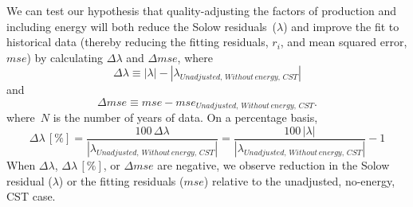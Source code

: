 \documentclass[preprint,authoryear,12pt]{elsarticle}\usepackage[]{graphicx}\usepackage[]{color}
\begin{document}
We can test our hypothesis that 
quality-adjusting the factors of production
and including energy will both reduce the Solow residuals~($\lambda$)
and improve the fit to historical data
(thereby reducing the fitting residuals, $r_i$, and mean squared error, $mse$)
by calculating 
$\Delta \lambda$ and $\Delta mse$, where
%
\begin{equation} \label{eq:delta_lambda}
  \Delta \lambda \equiv \left| \lambda \right| - \left| \lambda_{Unadjusted, \, Without \, energy, \, CST} \right|
\end{equation}
%
and
%
\begin{equation} \label{eq:delta_mse}
  \Delta mse \equiv mse - mse_{Unadjusted, \, Without \, energy, \, CST}.
\end{equation}
%
where~$N$ is the number of years of data.
On a percentage basis,
%
\begin{equation} \label{eq:delta_lambda_perc}
  \Delta \lambda \, [\%] = \frac{100 \, \Delta \lambda}{\left| \lambda_{Unadjusted, \, Without \, energy, \, CST} \right|} 
            = \frac{100 \, \left| \lambda \right|}{\left| \lambda_{Unadjusted, \, Without \, energy, \, CST} \right|} - 1
\end{equation}
%
When $\Delta \lambda$, $\Delta \lambda \, [\%]$, or $\Delta mse$ are negative, 
we observe reduction in the Solow residual ($\lambda$) or
the fitting residuals ($mse$)
relative to the unadjusted, no-energy, CST case.
\end{document}
